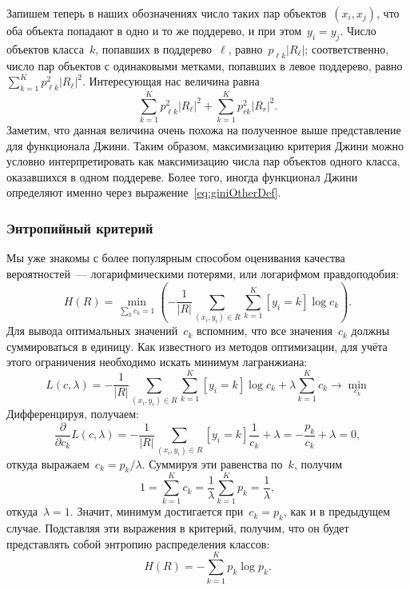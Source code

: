 \documentclass[12pt,fleqn]{article}
\begin{document}
Запишем теперь в наших обозначениях число таких пар объектов~$(x_i, x_j)$,
что оба объекта попадают в одно и то же поддерево, и при этом~$y_i = y_j$.
Число объектов класса~$k$, попавших в поддерево~$\ell$,
равно~$p_{\ell k} |R_\ell|$;
соответственно, число пар объектов с одинаковыми метками, попавших в левое
поддерево, равно~$\sum_{k = 1}^{K} p_{\ell k}^2 |R_\ell|^2$.
Интересующая нас величина равна
\begin{equation}
\label{eq:giniOtherDef}
    \sum_{k = 1}^{K} p_{\ell k}^2 |R_\ell|^2
    +
    \sum_{k = 1}^{K} p_{r k}^2 |R_r|^2.
\end{equation}
Заметим, что данная величина очень похожа на полученное
выше представление для функционала Джини.
Таким образом, максимизацию критерия Джини можно условно
интерпретировать как максимизацию числа пар объектов одного класса,
оказавшихся в одном поддереве.
Более того, иногда функционал Джини определяют именно через выражение~\eqref{eq:giniOtherDef}.

\subsubsection{Энтропийный критерий}
Мы уже знакомы с более популярным способом оценивания качества
вероятностей~--- логарифмическими потерями, или логарифмом правдоподобия:
\[
    H(R)
    =
    \min_{\sum_k c_k = 1} \left(
        -
        \frac{1}{|R|}
        \sum_{(x_i, y_i) \in R}
        \sum_{k = 1}^{K}
            [y_i = k]
            \log c_k
    \right).
\]
Для вывода оптимальных значений~$c_k$ вспомним, что все значения~$c_k$
должны суммироваться в единицу.
Как известного из методов оптимизации, для учёта этого ограничения необходимо искать
минимум лагранжиана:
\[
    L(c, \lambda)
    =
    -
    \frac{1}{|R|}
    \sum_{(x_i, y_i) \in R}
    \sum_{k = 1}^{K}
        [y_i = k]
        \log c_k
    +
    \lambda
    \sum_{k = 1}^{K}
        c_k
    \to
    \min_{c_k}
\]
Дифференцируя, получаем:
\[
    \frac{\partial}{\partial c_k}
    L(c, \lambda)
    =
    -
    \frac{1}{|R|}
    \sum_{(x_i, y_i) \in R}
        [y_i = k]
        \frac{1}{c_k}
    +
    \lambda
    =
    - \frac{p_k}{c_k}
    +
    \lambda
    =
    0,
\]
откуда выражаем~$c_k = p_k / \lambda$.
Суммируя эти равенства по~$k$, получим
\[
    1 = \sum_{k = 1}^{K} c_k = \frac{1}{\lambda} \sum_{k = 1}^{K} p_k = \frac{1}{\lambda},
\]
откуда~$\lambda = 1$.
Значит, минимум достигается при~$c_k = p_k$, как и в предыдущем случае.
Подставляя эти выражения в критерий, получим, что он будет представлять собой энтропию распределения классов:
\[
    H(R)
    =
    -
    \sum_{k = 1}^{K}
        p_k
        \log p_k.
\]
\end{document}
